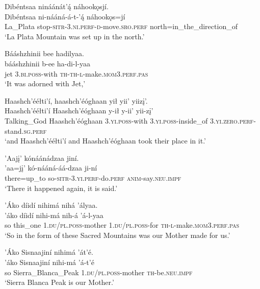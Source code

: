 \ea\label{ex:text4-10-1}
Dibéntsaa nináánát’ą́ náhookǫsjí.\\
\gll Dibéntsaa	ni-nááná-á-t-’ą́	náhookǫs=jí\\
     La\_Plata	stop-\textsc{sitr}-3.\textsc{ni}.\textsc{perf}-\textsc{d}-move.\textsc{sro}.\textsc{perf}	north=in\_the\_direction\_of\\
\glt `La Plata Mountain was set up in the north.'
\z

\ea\label{ex:text4-10-2}
Bááshzhinii bee hadilyaa.\\
\gll bááshzhinii	b-ee	ha-di-l-yaa\\
     jet	3.\textsc{bi}.\textsc{poss}-with	\textsc{th}-\textsc{th}-\textsc{l}-make.\textsc{mom}3.\textsc{perf}.\textsc{pas}\\
\glt `It was adorned with Jet,'
\z

\ea\label{ex:text4-10-3}
Haashch’ééłti’í, haashch’éóghaan yił yii’ yiizį’.\\
\gll Haashch’ééłti’í	Haashch’éóghaan	y-ił	y-ii’	yii-zį’\\
     Talking\_God	Haashch’éóghaan	3.\textsc{yi}.\textsc{poss}-with	3.\textsc{yi}.\textsc{poss}-inside\_of	3.\textsc{yi}.\textsc{zero}.\textsc{perf}-stand.\textsc{sg}.\textsc{perf}\\
\glt `and Haashch'ééłti'í and Haashch'éóghaan took their place in it.'
\z

\ea\label{ex:text4-10-4}
’Aajį’ kónáánádzaa jiní.\\
\gll ’aa=jį’	kó-nááná-áá-dzaa	ji-ní\\
     there=up\_to	so-\textsc{sitr}-3.\textsc{yi}.\textsc{perf}-do.\textsc{perf}	\textsc{anim}-say.\textsc{neu}.\textsc{impf}\\
\glt `There it happened again, it is said.'
\z

\ea\label{ex:text4-11-1}
’Áko díidí nihimá nihá ’ályaa.\\
\gll ’áko	díidí	nihi-má	nih-á	’á-l-yaa\\
     so	this\_one	1.\textsc{du}/\textsc{pl}.\textsc{poss}-mother	1.\textsc{du}/\textsc{pl}.\textsc{poss}-for	\textsc{th}-\textsc{l}-make.\textsc{mom}3.\textsc{perf}.\textsc{pas}\\
\glt `So in the form of these Sacred Mountains was our Mother made for us.'
\z

\ea\label{ex:text4-11-2}
’Áko Sisnaajiní nihimá ’át’é.\\
\gll ’áko	Sisnaajiní	nihi-má	’á-t’é\\
     so	Sierra\_Blanca\_Peak	1.\textsc{du}/\textsc{pl}.\textsc{poss}-mother	\textsc{th}-be.\textsc{neu}.\textsc{impf}\\
\glt `Sierra Blanca Peak is our Mother.'
\z

